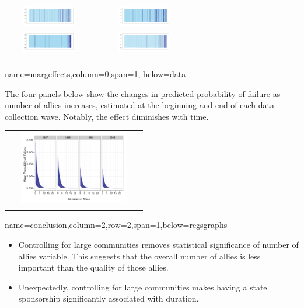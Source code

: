 \documentclass[landscape,paperheight=24in,fontscale=.45,paperwidth=36in,landscape,final]{baposter}
\begin{document}
\begin{poster}
{\begin{center}
\begin{tabular}{lcr}
\includegraphics[height=9mm,width=36mm]{separationplotsepDat7.pdf}& & \includegraphics[height=9mm,width=36mm]{separationplotsepDat8.pdf}\\
\includegraphics[height=9mm,width=36mm]{separationplotsepDat9.pdf}& & \includegraphics[height=9mm,width=36mm]{separationplotsepDat10.pdf}\\
\vspace{-6mm}
\end{tabular}
\end{center}
}



{name=margeffects,column=0,span=1, below=data}
{

The four panels below show the changes in predicted probability of failure
as number of allies increases, estimated at the beginning and end of
each data collection wave. Notably, the effect diminishes with time.
\vspace{-2mm}
\begin{center}
\begin{tabular}{c}
\includegraphics[height=32mm, width=59mm]{AlliesSimulations.pdf}\\
\vspace{-5.5mm}
\end{tabular}
\end{center}
}

{name=conclusion,column=2,row=2,span=1,below=regsgraphs}
{
\begin{itemize}
\item Controlling for large communities removes
  statistical significance of number of allies variable.  This
  suggests that the overall number of allies is less important than
  the quality of those allies. 
\item Unexpectedly, controlling for large communities makes
  having a state sponsorship significantly associated with duration.
\end{itemize}
\vspace{-4.0mm}
}



\end{poster}
\end{document}
